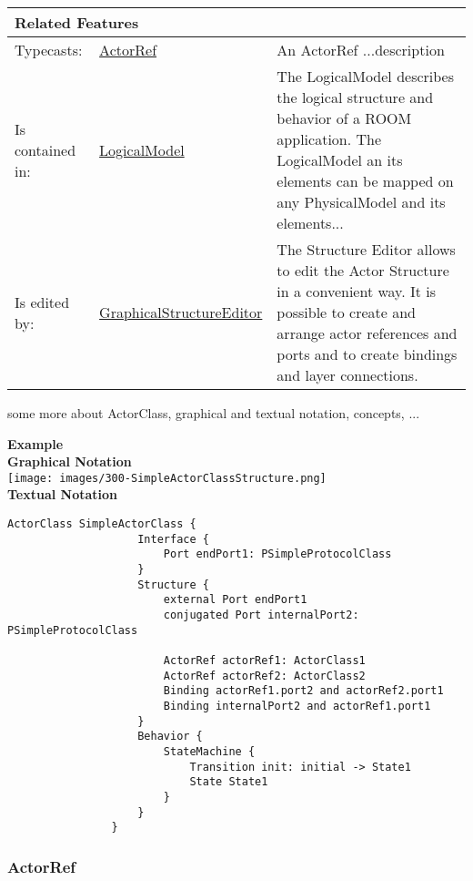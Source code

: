 			\vspace{\baselineskip}
			\begingroup
			\renewcommand{\arraystretch}{1.8} %
			\parbox{\textwidth}{
			\begin{longtable}{l l p{}}
				\multicolumn{2}{l}{\textbf{\large Related Features}} & \\
				\hline
			Typecasts: & \tabitem \hyperlink{ref:ActorRef}{ActorRef}  & An ActorRef ...description\\
			\hline
			Is contained in: & \tabitem \hyperlink{ref:LogicalModel}{LogicalModel}  & The LogicalModel describes the logical structure and behavior of a ROOM application. The LogicalModel an its elements can be mapped on any PhysicalModel and its elements...\\
			\hline
			Is edited by: & \tabitem \hyperlink{ref:GraphicalStructureEditor}{GraphicalStructureEditor}  & The Structure Editor allows to edit the Actor Structure in a convenient way. It is possible to create and arrange actor references and ports and to create bindings and layer connections.\\
			\hline
			\end{longtable}	
			}
			\endgroup
			\vspace{\baselineskip}
			
			some more about ActorClass, graphical and textual notation, concepts, ...
			
			\textbf{Example}
			\\
			\textbf{Graphical Notation}
			\\
				\texttt{[image: images/300-SimpleActorClassStructure.png]}
			\\
			\textbf{Textual Notation}
			\\
				\begin{lstlisting}[language=ROOM]
				ActorClass SimpleActorClass {
					Interface {
						Port endPort1: PSimpleProtocolClass
					}
					Structure {
						external Port endPort1
						conjugated Port internalPort2: PSimpleProtocolClass
			
						ActorRef actorRef1: ActorClass1
						ActorRef actorRef2: ActorClass2
						Binding actorRef1.port2 and actorRef2.port1
						Binding internalPort2 and actorRef1.port1
					}
					Behavior {
						StateMachine {
							Transition init: initial -> State1
							State State1
						}
					}
				}
				\end{lstlisting}
		
		\subsubsection{ActorRef}
			\hypertarget{ref:ActorRef}{}
			
